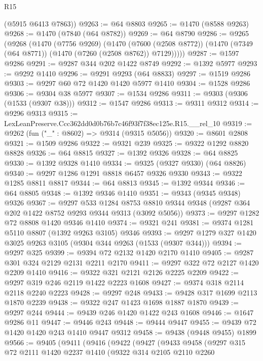 \begin{lexlean}{R15}
\begin{coremodule}
      (@5915 @6413 @7863))
@9263 := @64 @8803
@9265 := @1470 (@8588 @9263)
@9268 := @1470 (@7840 (@64 @8782))
@9269 := @64 @8790
@9286 := @9265
    (@9268
      (@1470
        (@7756 @9269)
        (@1470
          (@7600 (@2508 @8772))
          (@1470 (@7349 (@64 @8771)) (@1470 (@7260 (@2508 @8762)) @7129)))))
@9287 := @1597 @9286
@9291 := @9287 @344 @202 @1422 @8749
@9292 := @1392 @5977
@9293 := @9292 @1410
@9296 := @9291 @9293 (@64 @8833)
@9297 := @1519 @9286
@9303 := @9297 @60 @72 @1420 @1420 @5977 @1410
@9304 := @1528 @9286
@9306 := @9304 @38 @5977
@9307 := @1534 @9286
@9311 := @9303 (@9306 (@1533 (@9307 @38)))
@9312 := @1547 @9286
@9313 := @9311 @9312
@9314 := @9296 @9313
@9315 := LexLeanPreserve.Ccc362dd0d0b76b7c46f93f7f38ec125e.R15.__rel_10
@9319 := @9262 (fun ("_" : @8602) => @9314 (@9315 @5056))
@9320 := @8601 @2808
@9321 := @1509 @9286
@9322 := @9321 @239
@9325 := @9322 @1292 @8820 @8828
@9326 := @64 @8815
@9327 := @1392 @9326
@9328 := @64 @8825
@9330 := @1392 @9328 @1410
@9334 := @9325 (@9327 @9330) (@64 @8826)
@9340 := @9297 @1286 @1291 @8818 @6457 @9326 @9330
@9343 := @9322 @1285 @8811 @8817
@9344 := @64 @8813
@9345 := @1392 @9344
@9346 := @64 @8805
@9348 := @1392 @9346 @1410
@9351 := @9343 (@9345 @9348) @9326
@9367 := @9297
    @533
    @1284
    @8753
    @8810
    @9344
    @9348
    (@9287 @364 @202 @1422 @8752 @9293 @9344 @9313 (@3092 @5056))
@9373 := @9297 @1282 @72 @8808 @1420 @9346 @1410
@9374 := @9321 @241
@9381 := @9374 @1281 @5110 @8807 (@1392 @9263 @3105) @9346
@9393 := @9297 @1279 @327 @1420 @3025 @9263 @3105 (@9304 @344 @9263 (@1533 (@9307 @344)))
@9394 := @9297 @325
@9399 := @9394 @72 @2132 @1420 @2170 @1410
@9405 := @9287 @301 @324 @2129 @2131 @2211 @2170
@9411 := @9297 @322 @72 @2127 @1420 @2209 @1410
@9416 := @9322 @321 @2121 @2126 @2225 @2209
@9422 := @9297 @319 @246 @2119 @1422 @2223 @1608
@9427 := @9374 @318 @2114 @2118 @2240 @2223
@9428 := @9297 @248
@9433 := @9428 @317 @1699 @2113 @1870 @2239
@9438 := @9322 @247 @1423 @1698 @1887 @1870
@9439 := @9297 @244
@9444 := @9439 @246 @1420 @1422 @243 @1608
@9446 := @1647 @9286 @11
@9447 := @9446 @243
@9448 := @9444 @9447
@9455 := @9439 @72 @1420 @1420 @243 @1410 @9447 @9312
@9458 := @9438 (@9448 @9455) @1899
@9566 := @9405
    (@9411
      (@9416
        (@9422
          (@9427
            (@9433
              @9458
              (@9297
                @315
                @72
                @2111
                @1420
                @2237
                @1410
                (@9322
                  @314
                  @2105
                  @2110
                  @2260

\end{coremodule}
\end{lexlean}
